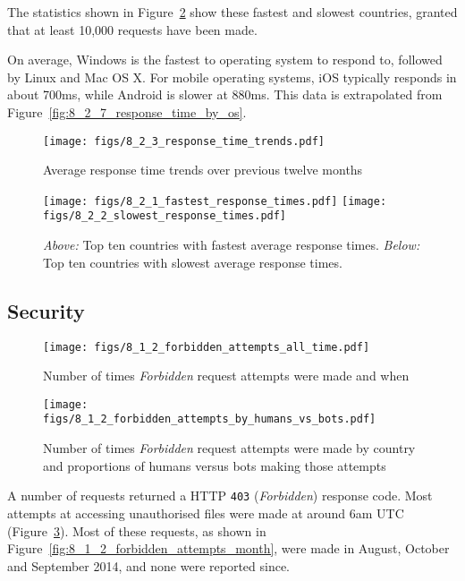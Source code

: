 \documentclass[12pt,titlepage]{article}
\begin{document}
The statistics shown in Figure~\ref{fig:8_2_1_fastest_response_times} show these fastest and slowest countries, granted that at least 10,000 requests have been made.

On average, Windows is the fastest to operating system to respond to, followed by Linux and Mac OS X. For mobile operating systems, iOS typically responds in about 700ms, while Android is slower at 880ms. This data is extrapolated from Figure~\ref{fig:8_2_7_response_time_by_os}.

\begin{figure}[thbp]
  \centering
  \texttt{[image: figs/8\_2\_3\_response\_time\_trends.pdf]}
  \caption{Average response time trends over previous twelve months}
  \label{fig:8_2_3_response_time_trends}
\end{figure}

\begin{figure}[p]
  \centering
  \texttt{[image: figs/8\_2\_1\_fastest\_response\_times.pdf]}
  \texttt{[image: figs/8\_2\_2\_slowest\_response\_times.pdf]}
  \caption[Average response times by country]{\textit{Above:} Top ten countries with fastest average response times. \textit{Below:} Top ten countries with slowest average response times.}
  \label{fig:8_2_1_fastest_response_times}
\end{figure}


\subsection{Security}
\label{ssub:security}
\begin{figure}[thbp]
  \centering
  \texttt{[image: figs/8\_1\_2\_forbidden\_attempts\_all\_time.pdf]}
  \caption{Number of times \textit{Forbidden} request attempts were made and when}
  \label{fig:8_1_2_forbidden_attempts_all_time}
\end{figure}

\begin{figure}[thbp]
  \centering
  \texttt{[image: figs/8\_1\_2\_forbidden\_attempts\_by\_humans\_vs\_bots.pdf]}
  \caption{Number of times \textit{Forbidden} request attempts were made by country and proportions of humans versus bots making those attempts}
  \label{fig:8_1_2_forbidden_attempts_by_humans_vs_bots}
\end{figure}

A number of requests returned a HTTP \texttt{403} (\textit{Forbidden}) response code.  Most attempts at accessing unauthorised files were made at around 6am UTC (Figure~\ref{fig:8_1_2_forbidden_attempts_all_time}). Most of these requests, as shown in Figure~\ref{fig:8_1_2_forbidden_attempts_month}, were made in August, October and September 2014, and none were reported since.
\end{document}
